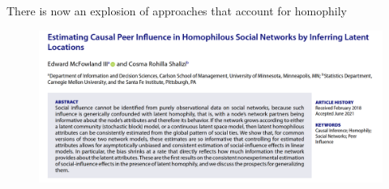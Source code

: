 \documentclass[aspectratio=169]{beamer}
\theoremstyle{remark}
\begin{document}
\begin{frame}{There is now an explosion of approaches that account for homophily}
    \begin{figure}
        \centering
        \includegraphics[width=\textwidth]{./figures/mcfowland2.png}
    \end{figure}
\end{frame}

\end{document}
